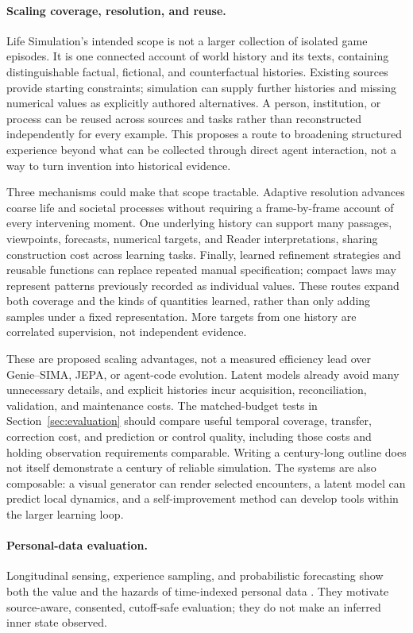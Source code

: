 \documentclass[10pt]{article}
\begin{document}
\paragraph{Scaling coverage, resolution, and reuse.}
Life Simulation's intended scope is not a larger collection of isolated game
episodes. It is one connected account of world history and its texts,
containing distinguishable factual, fictional, and counterfactual histories.
Existing sources provide starting constraints; simulation can supply further
histories and missing numerical values as explicitly authored alternatives.
A person, institution, or process can be reused across sources and tasks rather
than reconstructed independently for every example. This proposes a route to
broadening structured experience beyond what can be collected through direct
agent interaction, not a way to turn invention into historical evidence.

Three mechanisms could make that scope tractable. Adaptive resolution advances
coarse life and societal processes without requiring a frame-by-frame account
of every intervening moment. One underlying history can support many passages,
viewpoints, forecasts, numerical targets, and Reader interpretations, sharing
construction cost across learning tasks. Finally, learned refinement strategies
and reusable functions can replace repeated manual specification; compact laws
may represent patterns previously recorded as individual values. These routes
expand both coverage and the kinds of quantities learned, rather than only
adding samples under a fixed representation. More targets from one history
are correlated supervision, not independent evidence.

These are proposed scaling advantages, not a measured efficiency lead over
Genie--SIMA, JEPA, or agent-code evolution. Latent models already avoid many
unnecessary details, and explicit histories incur acquisition, reconciliation,
validation, and maintenance costs. The matched-budget tests in
Section~\ref{sec:evaluation} should compare useful temporal coverage, transfer,
correction cost, and prediction or control quality, including those costs and
holding observation requirements comparable. Writing a century-long outline
does not itself demonstrate a century of reliable simulation. The systems are
also composable: a visual generator can render selected encounters, a latent
model can predict local dynamics, and a self-improvement method can develop
tools within the larger learning loop.

\paragraph{Personal-data evaluation.}
Longitudinal sensing, experience sampling, and probabilistic forecasting show
both the value and the hazards of time-indexed personal data
\cite{shiffman2008,ponnada2022,burns2011mobilyze,
gneitingRaftery2007,tashman2000}. They motivate source-aware, consented,
cutoff-safe evaluation; they do not make an inferred inner state observed.
\end{document}
